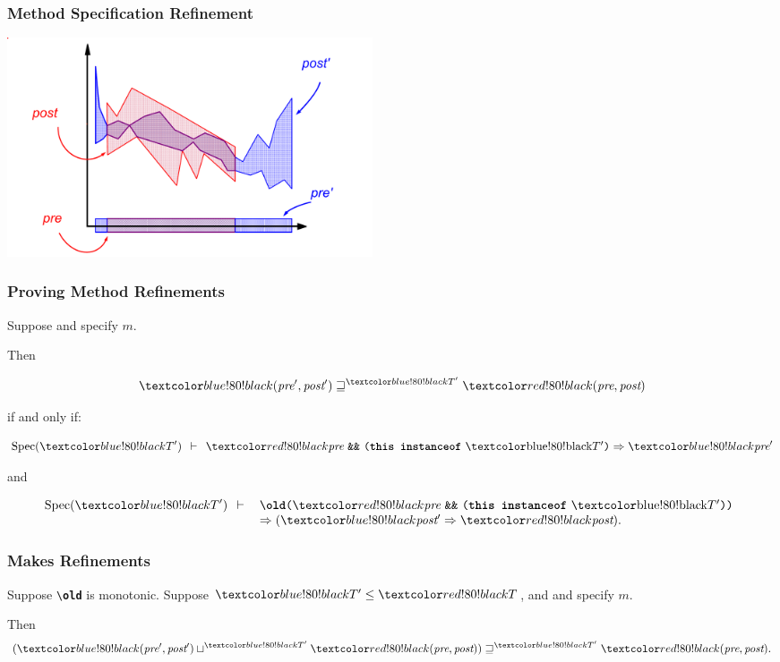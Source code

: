 \begin{frame}
\frametitle{Method Specification Refinement}
\transdissolve[duration=0.2]
\includegraphics[width=4.25in]{meth-refine3}
\end{frame}

\begin{frame}
\frametitle{Proving Method Refinements}
\begin{theorem}
\label{th:refinement}
Suppose  and 
specify $m$.

Then 

\begin{displaymath}
\BLUE{(\pre',\post')} \refines^{\BLUETP} \RED{(\pre,\post)}
\end{displaymath}

if and only if:

\begin{displaymath}
\Spec{{\BLUETP}} \Proves
 \RED{\pre} \mbox{ \texttt{\&\&} }
          \mbox{\texttt{(}\textbf{\texttt{this instanceof}} \BLUETP\texttt{)}}
 \Rightarrow \BLUE{\pre'}
\end{displaymath}

and

\begin{displaymath}
\Spec{{\BLUETP}} \Proves
\begin{array}[t]{l}
\mbox{\texttt{{\textbackslash}\textbf{old}(}}\RED{\pre}
   \mbox{ \texttt{\&\&} }
   \mbox{\texttt{(}\textbf{\texttt{this instanceof}} \BLUETP\texttt{))}} \\
   \Rightarrow (\BLUE{\post'} \Rightarrow \RED{\post}).
\end{array}
\end{displaymath}
\end{theorem}
\end{frame}

\begin{frame}
\frametitle{ Makes Refinements}

\begin{theorem}
Suppose \mbox{\texttt{{\textbackslash}\textbf{old}}}
is monotonic.
Suppose $\BLUETP \STO \REDT$, and
 and 
specify $m$.

Then 
\begin{displaymath}
(\BLUE{(\pre',\post')} \join^{\BLUETP} \RED{(\pre,\post)}) 
  \refines^{\BLUETP} \RED{(\pre,\post)}.
\end{displaymath}
\end{theorem}
\end{frame}

